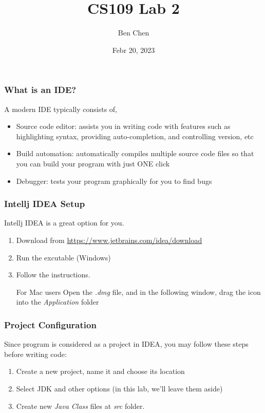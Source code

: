 \documentclass{beamer}
\title{CS109 Lab 2}
\author{Ben Chen}
\institute{SUSTech}
\date{Febr 20, 2023}
\begin{document}
\frame{\titlepage}
\begin{frame}[fragile]
    \frametitle{What is an IDE?}
    A modern IDE typically consists of,
    \begin{itemize}
        \item Source code editor: assists you in writing code with features such as highlighting syntax,
        providing auto-completion, and controlling version, etc
        \item Build automation: automatically compiles multiple source code files so that you can build
        your program with just ONE click
        \item Debugger: tests your program graphically for you to find bugs
    \end{itemize}
\end{frame}

\begin{frame}
    \frametitle{Intellj IDEA Setup}
    Intellj IDEA is a great option for you.
    \newline
    \begin{enumerate}
        \item Download from \url{https://www.jetbrains.com/idea/download}
        \item Run the excutable (Windows)
        \item Follow the instructions.
        \begin{block}{For Mac users}
            Open the \textit{.dmg} file, and in the following window, drag the icon into the \textit{Application} folder
        \end{block}
    \end{enumerate}
\end{frame}

\begin{frame}
    \frametitle{Project Configuration}
    Since program is considered as a project in IDEA, you may follow these steps before writing code:
    \begin{enumerate}
        \item Create a new project, name it and choose its location
        \item Select JDK and other options
        \newline (in this lab, we'll leave them aside)
        \item Create new \textit{Java Class} files at \textit{src} folder.
    \end{enumerate}
\end{frame}
\end{document}
